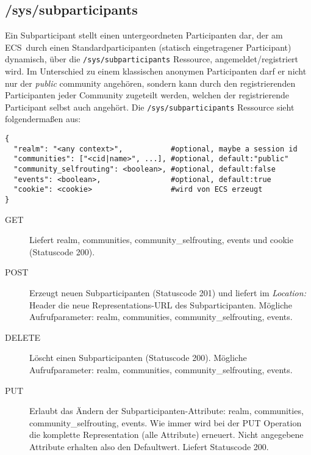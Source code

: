 \documentclass[12pt,a4paper]{article}
\newcommand{\ecs}{ECS}
\begin{document}
\subsection{/sys/subparticipants}
Ein Subparticipant stellt einen untergeordneten Participanten dar, der am \ecs\
durch einen Standardparticipanten (statisch eingetragener Participant)
dynamisch, über die \texttt{/sys/subparticipants} Ressource,
angemeldet/registriert wird. Im Unterschied zu einem klassischen anonymen
Participanten darf er nicht nur der \textit{public} community angehören,
sondern kann durch den registrierenden Participanten jeder Community zugeteilt
werden, welchen der registrierende Participant selbst auch angehört. Die
\texttt{/sys/subparticipants} Ressource sieht folgendermaßen aus:
\begin{verbatim}
{
  "realm": "<any context>",           #optional, maybe a session id
  "communities": ["<cid|name>", ...], #optional, default:"public"
  "community_selfrouting": <boolean>, #optional, default:false
  "events": <boolean>,                #optional, default:true
  "cookie": <cookie>                  #wird von ECS erzeugt
}
\end{verbatim}

\begin{description}
  \item[GET] Liefert realm, communities, community\_selfrouting, events und cookie (Statuscode 200).
  \item[POST] Erzeugt neuen Subparticipanten (Statuscode 201) und liefert im \textit{Location:} Header die neue Representations-URL des Subparticipanten. Mögliche Aufrufparameter: realm, communities, community\_selfrouting, events.
  \item[DELETE] Löscht einen Subparticipanten (Statuscode 200). Mögliche Aufrufparameter: realm, communities, community\_selfrouting, events.
  \item[PUT] Erlaubt das Ändern der Subparticipanten-Attribute: realm, communities, community\_selfrouting, events. Wie immer wird bei der PUT Operation die komplette Representation (alle Attribute) erneuert. Nicht angegebene Attribute erhalten also den Defaultwert. Liefert Statuscode 200.
\end{description}
\end{document}
